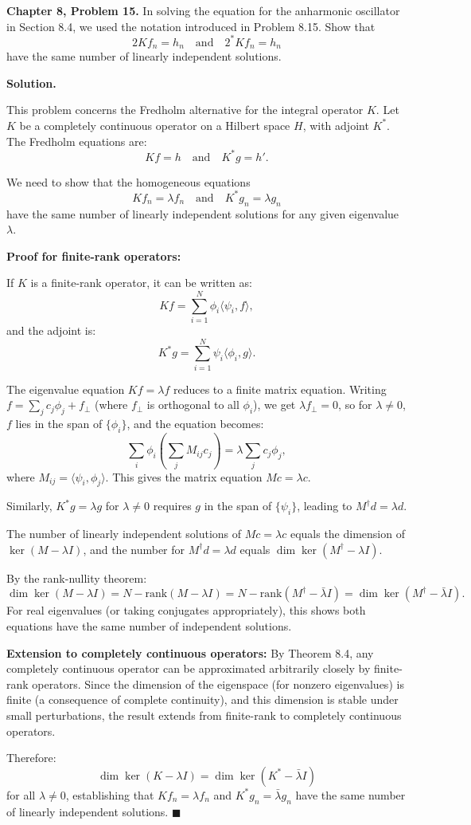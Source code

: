 \documentclass[12pt]{article}
\begin{document}
\textbf{Chapter 8, Problem 15.} In solving the equation for the anharmonic oscillator in Section 8.4, we used the notation introduced in Problem 8.15. Show that
\[
2Kf_n = h_n
\quad\text{and}\quad
2^* K f_n = h_n
\]
have the same number of linearly independent solutions.

\bigskip
\textbf{Solution.}

This problem concerns the Fredholm alternative for the integral operator $K$. Let $K$ be a completely continuous operator on a Hilbert space $H$, with adjoint $K^*$. The Fredholm equations are:
\[
Kf = h \quad\text{and}\quad K^*g = h'.
\]

We need to show that the homogeneous equations
\[
Kf_n = \lambda f_n \quad\text{and}\quad K^*g_n = \lambda g_n
\]
have the same number of linearly independent solutions for any given eigenvalue $\lambda$.

\textbf{Proof for finite-rank operators:}

If $K$ is a finite-rank operator, it can be written as:
\[
Kf = \sum_{i=1}^{N} \phi_i\langle\psi_i, f\rangle,
\]
and the adjoint is:
\[
K^*g = \sum_{i=1}^{N} \psi_i\langle\phi_i, g\rangle.
\]

The eigenvalue equation $Kf = \lambda f$ reduces to a finite matrix equation. Writing $f = \sum_j c_j\phi_j + f_\perp$ (where $f_\perp$ is orthogonal to all $\phi_i$), we get $\lambda f_\perp = 0$, so for $\lambda\neq 0$, $f$ lies in the span of $\{\phi_i\}$, and the equation becomes:
\[
\sum_i \phi_i\left(\sum_j M_{ij}c_j\right) = \lambda\sum_j c_j\phi_j,
\]
where $M_{ij} = \langle\psi_i,\phi_j\rangle$. This gives the matrix equation $Mc = \lambda c$.

Similarly, $K^*g = \lambda g$ for $\lambda\neq 0$ requires $g$ in the span of $\{\psi_i\}$, leading to $M^\dagger d = \lambda d$.

The number of linearly independent solutions of $Mc=\lambda c$ equals the dimension of $\ker(M-\lambda I)$, and the number for $M^\dagger d = \lambda d$ equals $\dim\ker(M^\dagger - \lambda I)$.

By the rank-nullity theorem:
\[
\dim\ker(M-\lambda I) = N - \text{rank}(M-\lambda I) = N - \text{rank}(M^\dagger-\bar\lambda I) = \dim\ker(M^\dagger-\bar\lambda I).
\]
For real eigenvalues (or taking conjugates appropriately), this shows both equations have the same number of independent solutions.

\textbf{Extension to completely continuous operators:} By Theorem 8.4, any completely continuous operator can be approximated arbitrarily closely by finite-rank operators. Since the dimension of the eigenspace (for nonzero eigenvalues) is finite (a consequence of complete continuity), and this dimension is stable under small perturbations, the result extends from finite-rank to completely continuous operators.

Therefore:
\[
\boxed{\dim\ker(K-\lambda I) = \dim\ker(K^*-\bar\lambda I)}
\]
for all $\lambda\neq 0$, establishing that $Kf_n = \lambda f_n$ and $K^*g_n = \bar\lambda g_n$ have the same number of linearly independent solutions. $\blacksquare$
\end{document}
